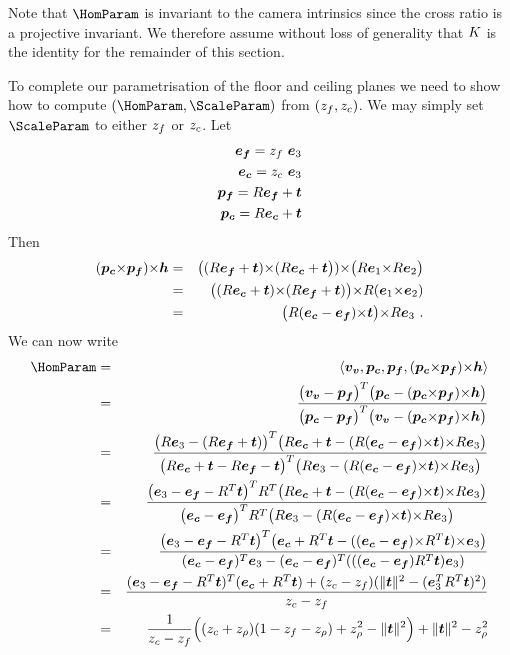 Note that $\HomParam$ is invariant to the camera intrinsics since the
cross ratio is a projective invariant\cite{Criminisi01}. We therefore
assume without loss of generality that $\CamMatrix$ is the identity
for the remainder of this section.

To complete our parametrisation of the floor and ceiling planes we
need to show how to compute $(\HomParam,\ScaleParam)$ from
$(\zfloor,\zceil)$. We may simply set $\ScaleParam$ to either
$\zfloor$ or $\zceil$. Let
\begin{eqnarray}
  \efloor = \zfloor ~ \ez \\
  \eceil = \zceil ~ \ez \\
  \pfloor = \RetProj{\efloor} \\
  \pceil = \RetProj{\eceil}
\end{eqnarray}
Then
\begin{eqnarray}
  (\pceil \cross \pfloor) \cross \horizon &=&
    \bigl((\RetProj{\efloor}) \cross (\RetProj{\eceil}\bigr))
    \cross
    \bigl(\CamR\ex \cross
          \CamR\ey \bigr)\\
  &=& \bigl( (\RetProj{\eceil}) \cross (\RetProj{\efloor}) \bigr)
      \cross
      \CamR(\ex\cross\ey) \\
  &=& \bigl( \CamR(\eceil-\efloor)\cross\CamTr \bigr)
      \cross
      \CamR\ez ~.
\end{eqnarray}
We can now write
\begin{eqnarray}
  \HomParam &=& 
    \langle\vvpt,\pceil,\pfloor,(\pceil\cross\pfloor)\cross\horizon\rangle \\
  &=& \frac{
    \bigl(\vvpt-\pfloor\bigr)^T
    \bigl(\pceil-(\pceil\cross\pfloor)\cross\horizon\bigr)
   }{
    \bigl(\pceil-\pfloor\bigr)^T
    \bigl(\vvpt-(\pceil\cross\pfloor)\cross\horizon\bigr)
   }\\
  &=& \frac{
    \bigl(\CamR\ez - (\CamR\efloor+\CamTr)\bigr)^T
    \bigl(\CamR\eceil+\CamTr-
          (\CamR(\eceil-\efloor)\cross\CamTr)\cross\CamR\ez
          \bigr)
   }{
    \bigl(\CamR\eceil+\CamTr-\CamR\efloor-\CamTr\bigr)^T
    \bigl(\CamR\ez-
          (\CamR(\eceil-\efloor)\cross\CamTr)\cross\CamR\ez
          \bigr)
   }\\
  &=& \frac{
    \bigl(\ez - \efloor - \CamR^T\CamTr\bigr)^T R^T
    \bigl(\CamR\eceil+\CamTr-
          (\CamR(\eceil-\efloor)\cross\CamTr)\cross\CamR\ez
          \bigr)
   }{
    \bigl(\eceil-\efloor\bigr)^T R^T
    \bigl(\CamR\ez-
          (\CamR(\eceil-\efloor)\cross\CamTr)\cross\CamR\ez
          \bigr)
   }\\
  &=& \frac{
    \bigl(\ez - \efloor - \CamR^T\CamTr\bigr)^T
    \bigl(\eceil + \CamR^T\CamTr -
          ((\eceil-\efloor)\cross\CamR^T\CamTr)\cross\ez
          \bigr)
   }{
    (\eceil-\efloor)^T\ez -
    (\eceil-\efloor)^T(((\eceil-\efloor)\CamR^T\CamTr)\ez)
   }\\
  &=& \frac{
    (\ez-\efloor-\CamR^T\CamTr)^T(\eceil+\CamR^T\CamTr)
    +(\zceil-\zfloor)(\|\CamTr\|^2 - (\ez^T\CamR^T\CamTr)^2)
   }{
    \zceil-\zfloor
   }\\
  &=& \frac{1}{\zceil-\zfloor}
    \Bigl( (\zceil + \zcam)(1-\zfloor-\zcam) + \zcam^2 - \|\CamTr\|^2 \Bigr)
     + \|\CamTr\|^2 - \zcam^2
\end{eqnarray}
